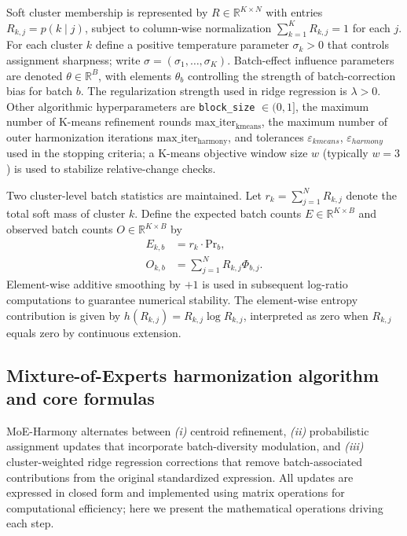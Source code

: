 \documentclass{article}
\begin{document}
Soft cluster membership is represented by $R \in \mathbb{R}^{K \times N}$ with entries $R_{k,j} = p(k \mid j)$, subject to column-wise normalization $\sum_{k=1}^K R_{k,j} = 1$ for each $j$. For each cluster $k$ define a positive temperature parameter $\sigma_k > 0$ that controls assignment sharpness; write $\sigma = (\sigma_1, \dots, \sigma_K)$. Batch-effect influence parameters are denoted $\theta \in \mathbb{R}^B$, with elements $\theta_b$ controlling the strength of batch-correction bias for batch $b$. The regularization strength used in ridge regression is $\lambda > 0$. Other algorithmic hyperparameters are \texttt{block\_size} $\in (0,1]$, the maximum number of K-means refinement rounds $\mathrm{max\_iter_{kmeans}}$, the maximum number of outer harmonization iterations $\mathrm{max\_iter_{harmony}}$, and tolerances $\varepsilon_{kmeans}$, $\varepsilon_{harmony}$ used in the stopping criteria; a K-means objective window size $w$ (typically $w=3$) is used to stabilize relative-change checks.

Two cluster-level batch statistics are maintained. Let $r_k = \sum_{j=1}^N R_{k,j}$ denote the total soft mass of cluster $k$. Define the expected batch counts $E \in \mathbb{R}^{K \times B}$ and observed batch counts $O \in \mathbb{R}^{K \times B}$ by
\begin{align}
    E_{k,b} &= r_k \cdot \mathrm{Pr}_b, \\
    O_{k,b} &= \sum_{j=1}^N R_{k,j} \Phi_{b,j}.
\end{align}
Element-wise additive smoothing by $+1$ is used in subsequent log-ratio computations to guarantee numerical stability. The element-wise entropy contribution is given by $h(R_{k,j}) = R_{k,j} \log R_{k,j}$, interpreted as zero when $R_{k,j}$ equals zero by continuous extension.

\subsection{Mixture-of-Experts harmonization algorithm and core formulas}

MoE-Harmony alternates between \textit{(i)} centroid refinement, \textit{(ii)} probabilistic assignment updates that incorporate batch-diversity modulation, and \textit{(iii)} cluster-weighted ridge regression corrections that remove batch-associated contributions from the original standardized expression. All updates are expressed in closed form and implemented using matrix operations for computational efficiency; here we present the mathematical operations driving each step.
\end{document}
